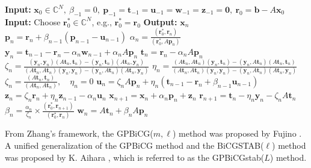 \begin{algorithm}[H]\caption{{The GPBiCG method}}\label{alg:gpbicg}\begin{algorithmic}[1]
\Statex\textbf{Input:} $\bm x_0\in\mathbb C^N,\ \beta_{-1}=0,\ \bm p_{-1}=\bm t_{-1}=\bm u_{-1}=\bm w_{-1}=\bm z_{-1}=\bm0,\ \bm r_0=\bm b-A\bm x_0$
\Statex\textbf{Input:} {Choose $\bm r_0^{*}\in\mathbb C^N$, e.g., $\bm r_0^{*}=\bm r_0$}
\Statex\textbf{Output:} $\bm x_n$
\State $\bm p_n=\bm r_n+\beta_{n-1}(\bm p_{n-1}-\bm u_{n-1})$
\State $\alpha_n=\frac{(\bm r_0^{*},\bm r_n)}{(\bm r_0^{*},A\bm p_n)}$
\State $\bm y_n=\bm t_{n-1}-\bm r_n-\alpha_n\bm w_{n-1}+\alpha_nA\bm p_n$
\State $\bm t_n=\bm r_n-\alpha_nA\bm p_n$
\State $\zeta_n=\frac{(\bm y_n,\bm y_n)(A\bm t_n,\bm t_n)-(\bm y_n,\bm t_n)(A\bm t_n,\bm y_n)}{(A\bm t_n,A\bm t_n)(\bm y_n,\bm y_n)-(\bm y_n,A\bm t_n)(A\bm t_n,\bm y_n)}$
\State $\eta_n=\frac{(A\bm t_n,A\bm t_n)(\bm y_n,\bm t_n)-(\bm y_n,A\bm t_n)(A\bm t_n,\bm t_n)}{(A\bm t_n,A\bm t_n)(\bm y_n,\bm y_n)-(\bm y_n,A\bm t_n)(A\bm t_n,\bm y_n)}$
\State $\zeta_n=\frac{(A\bm t_n,\bm t_n)}{(A\bm t_n,A\bm t_n)},\quad\eta_n=0$
\EndIf
\State $\bm u_n=\zeta_nA\bm p_n+\eta_n(\bm t_{n-1}-\bm r_n+\beta_{n-1}\bm u_{n-1})$
\State $\bm z_n=\zeta_n\bm r_n+\eta_n\bm z_{n-1}-\alpha_n\bm u_n$
\State $\bm x_{n+1}=\bm x_n+\alpha_n\bm p_n+\bm z_n$
\State $\bm r_{n+1}=\bm t_n-\eta_n\bm y_n-\zeta_nA\bm t_n$
\State $\beta_n=\frac{\alpha_n}{\zeta_n}\times\frac{(\bm r_0^{*},\bm r_{n+1})}{(\bm r_0^{*},\bm r_n)}$
\State $\bm w_n=A\bm t_n+\beta_nA\bm p_n$
\EndFor\end{algorithmic}\end{algorithm}
{From Zhang's framework, the GPBiCG($m,\ell$) method was proposed by Fujino . A unified generalization of the GPBiCG method and the BiCGSTAB($\ell$) method was proposed by K. Aihara , which is referred to as the GPBiCGstab($L$) method.}
